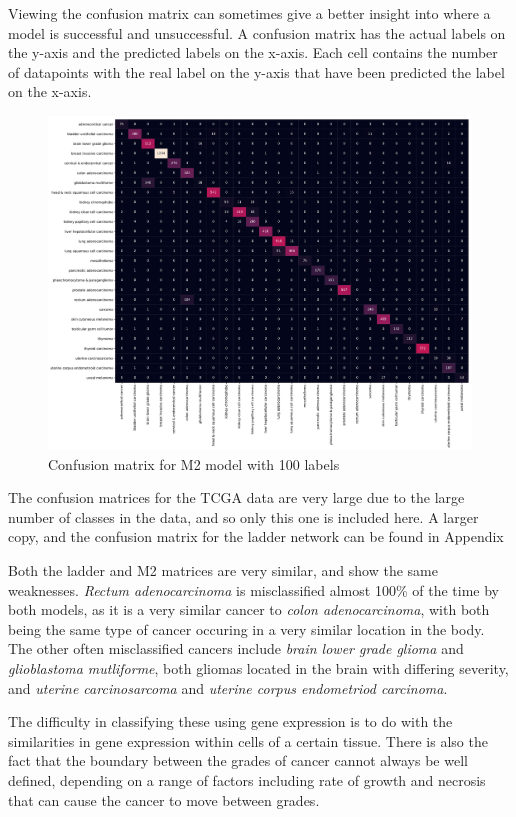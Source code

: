 Viewing the confusion matrix can sometimes give a better insight into where a model is successful and unsuccessful. A confusion
matrix has the actual labels on the y-axis and the predicted labels on the x-axis. Each cell contains the number of datapoints with the 
real label on the y-axis that have been predicted the label on the x-axis.

\begin{figure}[H]
  \centering
  \includegraphics[scale=0.35]{figs/m2_tcga_minmax_m2_100.pdf}
  \caption{Confusion matrix for M2 model with 100 labels}
\end{figure}

The confusion matrices for the TCGA data are very large due to the large number of classes in the data, and so only this one is included
here. A larger copy, and the confusion matrix for the ladder network can be found in Appendix

Both the ladder and M2 matrices are very similar, and show the same weaknesses. \textit{Rectum adenocarcinoma} 
is misclassified almost 
100\% of the time by both models, as it is a very similar cancer to \textit{colon adenocarcinoma}, with both being the same type of cancer
occuring in a very similar location in the body. The other often misclassified cancers include \textit{brain lower grade glioma} and 
\textit{glioblastoma mutliforme}, both gliomas located in the brain with differing severity, and \textit{uterine carcinosarcoma} and 
\textit{uterine corpus endometriod carcinoma}. 

The difficulty in classifying these using gene expression is to do with the similarities in gene expression within cells of a certain tissue.
There is also the fact that the boundary between the grades of cancer cannot always be well defined, depending on a range of factors 
including rate of growth and necrosis that can cause the cancer to move between grades.

